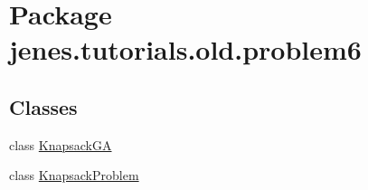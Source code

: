 \hypertarget{namespacejenes_1_1tutorials_1_1old_1_1problem6}{\section{Package jenes.\-tutorials.\-old.\-problem6}
\label{namespacejenes_1_1tutorials_1_1old_1_1problem6}
}
\subsection*{Classes}
\begin{DoxyCompactItemize}
\item 
class \hyperlink{classjenes_1_1tutorials_1_1old_1_1problem6_1_1_knapsack_g_a}{Knapsack\-G\-A}
\item 
class \hyperlink{classjenes_1_1tutorials_1_1old_1_1problem6_1_1_knapsack_problem}{Knapsack\-Problem}
\end{DoxyCompactItemize}
